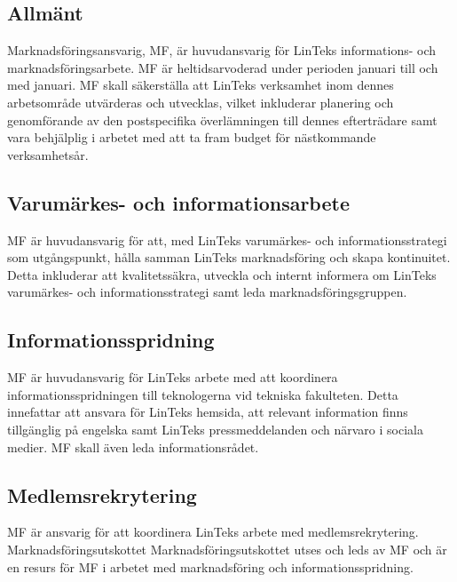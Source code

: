 \hypertarget{allmuxe4nt-5}{%
\subsection{Allmänt}\label{allmuxe4nt-5}}

Marknadsföringsansvarig, MF, är huvudansvarig för LinTeks informations-
och marknadsföringsarbete. MF är heltidsarvoderad under perioden januari
till och med januari. MF skall säkerställa att LinTeks verksamhet inom
dennes arbetsområde utvärderas och utvecklas, vilket inkluderar
planering och genomförande av den postspecifika överlämningen till
dennes efterträdare samt vara behjälplig i arbetet med att ta fram
budget för nästkommande verksamhetsår.

\hypertarget{varumuxe4rkes--och-informationsarbete}{%
\subsection{Varumärkes- och
informationsarbete}\label{varumuxe4rkes--och-informationsarbete}}

MF är huvudansvarig för att, med LinTeks varumärkes- och
informationsstrategi som utgångspunkt, hålla samman LinTeks
marknadsföring och skapa kontinuitet. Detta inkluderar att
kvalitetssäkra, utveckla och internt informera om LinTeks varumärkes-
och informationsstrategi samt leda marknadsföringsgruppen.

\hypertarget{informationsspridning}{%
\subsection{Informationsspridning}\label{informationsspridning}}

MF är huvudansvarig för LinTeks arbete med att koordinera
informationsspridningen till teknologerna vid tekniska fakulteten. Detta
innefattar att ansvara för LinTeks hemsida, att relevant information
finns tillgänglig på engelska samt LinTeks pressmeddelanden och närvaro
i sociala medier. MF skall även leda informationsrådet.

\hypertarget{medlemsrekrytering}{%
\subsection{Medlemsrekrytering}\label{medlemsrekrytering}}

MF är ansvarig för att koordinera LinTeks arbete med medlemsrekrytering.
Marknadsföringsutskottet Marknadsföringsutskottet utses och leds av MF
och är en resurs för MF i arbetet med marknadsföring och
informationsspridning.

